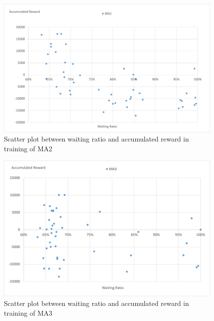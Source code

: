\begin{figure}[htbp]
  \centering
  \includegraphics[scale=0.5]{./Figure/ma2waitingReward.png}
  \caption{Scatter plot between waiting ratio and accumulated reward in training of MA2}
  \label{fig:ma2waitingReward}
\end{figure}

\begin{figure}[htbp]
  \centering
  \includegraphics[scale=0.5]{./Figure/ma3waitingReward.png}
  \caption{Scatter plot between waiting ratio and accumulated reward in training of MA3}
  \label{fig:ma3waitingReward}
\end{figure}

